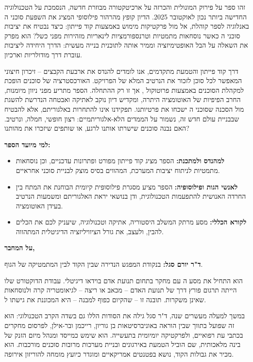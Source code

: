 \documentclass{hebrew-academic-template}
\begin{document}
זהו ספר על פירוק המונולית והכרזה על ארכיטקטורה מבוזרת חדשה, הנסמכת על הטכנולוגיה החדישה ביותר נכון לאוקטובר \num{2025}. הדיון קופץ מהרהור פילוסופי המציג את השפעת סוכני ה באנלוגיה לספר קוהלת, אל מול פרקטיקות מימוש באמצעות קוד פייתון: כיצד נבטיח את יציבות סוכני ה כאשר נוסחאות מתמטיות וטרנספורמציות לינאריות מזהירות מפני כשל? הוא מפרק את השאלה על הבל האופטימיזציה וממיר אותה לתוכנית בנייה מעשית: הדרך היחידה ליציבות עוברת דרך מודולריות וארכיון.

דרך קוד פייתון והטמעת  מתקדמים, אנו לומדים להנדס את ארבעת הקבצים – זיכרון חיצוני המאפשר לכל סוכן לזכור את הנרטיב המלא של הפרויקט. האורכסטרציה של סוכנים הופכת למקהלת הסוכנים באמצעות פרוטוקול , אך זו רק ההתחלה. הספר מתריע מפני ניוון מיומנות, החרב הפיפיות של האוטומציה היתרה, ומקדיש דיון נוקב לאתיקה ואבטחה הנדרשת להשגת  מול הסכנה שסוכני ה ישכחו את פרטיותנו. תפקידנו אינו להתחרות באלגוריתם, אלא להבטיח שבבניית עולם חדש זה, נשמור על הממדים הלא-אלגוריתמיים: רצון חופשי, חמלה, ונרטיב. האם נבנה סוכנים שישרתו אותנו לרגע, או שותפים שיזכרו את מהותנו?

\textbf{למי מיועד הספר:}

\begin{itemize}
\item \textbf{למהנדס ולמתכנת:} הספר מציג קוד פייתון מפורט ופתרונות  עדכניים, וכן נוסחאות מתמטיות לניתוח יציבות המערכת, המהווים בסיס מוצק לבניית סוכני  אחראיים.
\item \textbf{לאנשי הגות ופילוסופיה:} הספר מציע מסגרת פילוסופית קיומית הבוחנת את המתח בין החרדה האנושית להתפעמות הטכנולוגית, ודן בנושאי יראת האלגוריתם ומשמעות הנרטיב בעידן האוטומציה.
\item \textbf{לקורא הכללי:} מסע מרתק המשלב היסטוריה, אתיקה וטכנולוגיה, שיעניק לכם את הכלים להבין, ולעצב, את גורל הציוויליזציה הדיגיטלית המתהווה.
\end{itemize}

\textbf{על המחבר,}

\textbf{ד"ר יורם סגל:} בנקודת המפגש הנדירה שבין הקוד לבין המתמטיקה של הגוף.

הוא התחיל את מסע ה עם מחקר בתחום תנועת אדם בוידאו דיגיטלי. עבודת הדוקטורט שלו הייתה תרגום פורץ דרך של תנועת האדם – מכאב או ריצה – לגיאומטריה קרה ולנוסחאות שאינן משקרות. תובנה זו – שהקיום כפוף למבנה – היא המכוננת את גישתו ל.

במשך למעלה מעשרים שנה, ד"ר סגל גילה את הסודות הללו גם בשדה הקרב הטכנולוגי: הוא זה שפועל בתווך שבין הוראה באוניברסיטאות בן גוריון, רייכמן ובר-אילן, לפרסום מחקרים בכתבי עת רפואיים, ולפרקטיקה יומיומית בתעשייה. הוא שימש כמייסד ומנהל מיזם הזנק של בינה מלאכותית, שם הוביל הטמעת  באירגונים ובניית מערכות מרובות סוכנים מורכבות. הוא מכיר את גבולות הקוד, נושא בפטנטים אמריקאיים ומוגדר כיועץ מומחה להוריזון אירופה.
\end{document}
